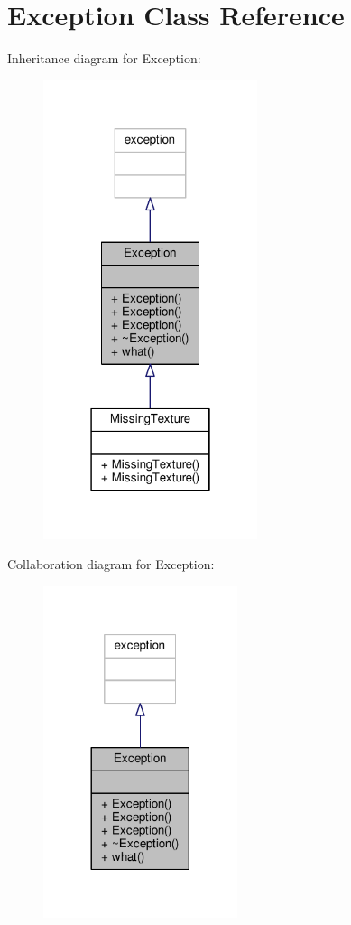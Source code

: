 \hypertarget{classException}{}\section{Exception Class Reference}
\label{classException}


Inheritance diagram for Exception\+:
\nopagebreak
\begin{figure}[H]
\begin{center}
\leavevmode
\includegraphics[width=178pt]{d5/d4c/classException__inherit__graph}
\end{center}
\end{figure}


Collaboration diagram for Exception\+:
\nopagebreak
\begin{figure}[H]
\begin{center}
\leavevmode
\includegraphics[width=161pt]{d3/d79/classException__coll__graph}
\end{center}
\end{figure}
